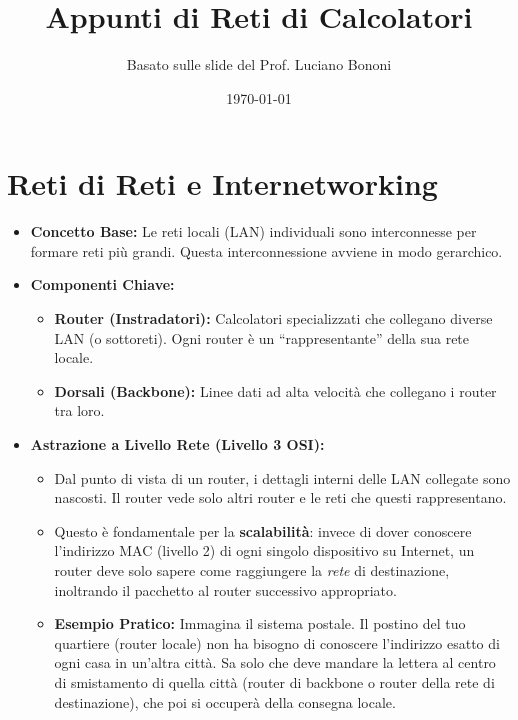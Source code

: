 \documentclass{article}
\title{Appunti di Reti di Calcolatori}
\author{Basato sulle slide del Prof. Luciano Bononi}
\date{\today}
\begin{document}
\maketitle
\tableofcontents
\newpage

\section{Reti di Reti e Internetworking}
\begin{itemize}
    \item \textbf{Concetto Base:} Le reti locali (LAN) individuali sono interconnesse per formare reti più grandi. Questa interconnessione avviene in modo gerarchico.
    \item \textbf{Componenti Chiave:}
    \begin{itemize}
        \item \textbf{Router (Instradatori):} Calcolatori specializzati che collegano diverse LAN (o sottoreti). Ogni router è un ``rappresentante'' della sua rete locale.
        \item \textbf{Dorsali (Backbone):} Linee dati ad alta velocità che collegano i router tra loro.
    \end{itemize}
    \item \textbf{Astrazione a Livello Rete (Livello 3 OSI):}
    \begin{itemize}
        \item Dal punto di vista di un router, i dettagli interni delle LAN collegate sono nascosti. Il router vede solo altri router e le reti che questi rappresentano.
        \item Questo è fondamentale per la \textbf{scalabilità}: invece di dover conoscere l'indirizzo MAC (livello 2) di ogni singolo dispositivo su Internet, un router deve solo sapere come raggiungere la \textit{rete} di destinazione, inoltrando il pacchetto al router successivo appropriato.
        \item \textbf{Esempio Pratico:} Immagina il sistema postale. Il postino del tuo quartiere (router locale) non ha bisogno di conoscere l'indirizzo esatto di ogni casa in un'altra città. Sa solo che deve mandare la lettera al centro di smistamento di quella città (router di backbone o router della rete di destinazione), che poi si occuperà della consegna locale.
    \end{itemize}
    \begin{figure}[H]
        \centering

\end{figure}
\end{itemize}
\end{document}
